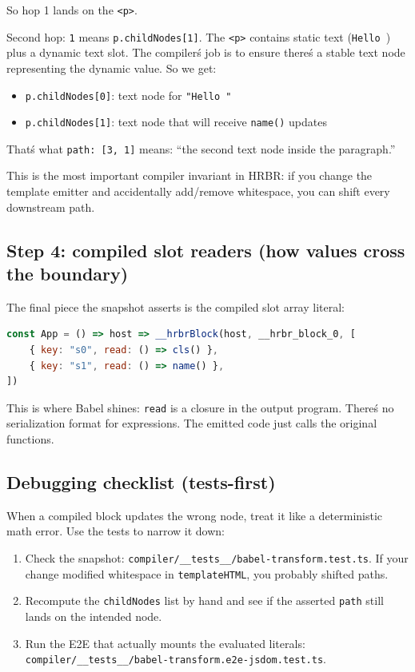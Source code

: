So hop 1 lands on the \texttt{<p>}.

Second hop: \texttt{1} means \texttt{p.childNodes[1]}.
The \texttt{<p>} contains static text (\texttt{Hello }) plus a dynamic text slot.
The compiler\'s job is to ensure there\'s a stable text node representing the dynamic value.
So we get:

\begin{itemize}
\item \texttt{p.childNodes[0]}: text node for \texttt{"Hello "}
\item \texttt{p.childNodes[1]}: text node that will receive \texttt{name()} updates
\end{itemize}

That\'s what \texttt{path: [3, 1]} means: ``the second text node inside the paragraph.''

This is the most important compiler invariant in HRBR: if you change the template emitter and accidentally add/remove whitespace, you can shift every downstream path.

\subsection{Step 4: compiled slot readers (how values cross the boundary)}

The final piece the snapshot asserts is the compiled slot array literal:

\begin{lstlisting}[language=JavaScript]
const App = () => host => __hrbrBlock(host, __hrbr_block_0, [
	{ key: "s0", read: () => cls() },
	{ key: "s1", read: () => name() },
])
\end{lstlisting}

This is where Babel shines: \texttt{read} is a closure in the output program.
There\'s no serialization format for expressions.
The emitted code just calls the original functions.

\subsection{Debugging checklist (tests-first)}

When a compiled block updates the wrong node, treat it like a deterministic math error.
Use the tests to narrow it down:

\begin{enumerate}
\item Check the snapshot: \texttt{compiler/\_\_tests\_\_/babel-transform.test.ts}.
  If your change modified whitespace in \texttt{templateHTML}, you probably shifted paths.
\item Recompute the \texttt{childNodes} list by hand and see if the asserted \texttt{path} still lands on the intended node.
\item Run the E2E that actually mounts the evaluated literals:
  	\texttt{compiler/\_\_tests\_\_/babel-transform.e2e-jsdom.test.ts}.
\end{enumerate}

